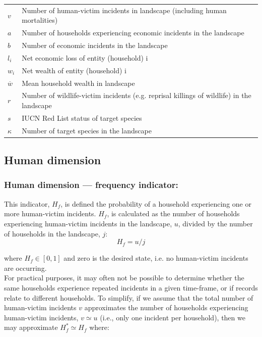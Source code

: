 \documentclass[fleqn,10pt]{olplainarticle}
\begin{document}
\begin{table}[!ht]
\begin{tabular}{p{1cm} p{13cm}}
         $v$ &	Number of human-victim incidents in landscape (including human mortalities) \\
         $a$ &	Number of households experiencing economic incidents in the landscape \\
         $b$ &	Number of economic incidents in the landscape \\
         $l_i$ &	Net economic loss of entity (household) i \\
         $w_i$ &	Net wealth of entity (household) i \\
         $\overline{w}$ & Mean household wealth in landscape \\
         $r$ &	Number of wildlife-victim incidents (e.g. reprisal killings of wildlife) in the landscape \\
         $s$ & IUCN Red List status of target species \\
         $\kappa$ & Number of target species in the landscape
    \end{tabular}
\end{table}


\subsection*{Human dimension}
\subsubsection*{Human dimension --- frequency indicator:}
This indicator, $H_f$, is defined the probability of a household experiencing one or more human-victim incidents. $H_f$, is calculated as the number of households experiencing human-victim incidents in the landscape, $u$, divided by the number of households in the landscape, $j$:
\begin{equation*}
    H_f = u/j
\end{equation*}

where $H_f \in [0,1]$ and zero is the desired state, i.e. no human-victim incidents are occurring.\\

For practical purposes, it may often not be possible to determine whether the same households experience repeated incidents in a given time-frame, or if records relate to different households. To simplify, if we assume that the total number of human-victim incidents $v$ approximates the number of households experiencing human-victim incidents, $v \simeq u$ (i.e., only one incident per household), then we may approximate $H_f^\ast \simeq H_f$ where:
\end{document}

